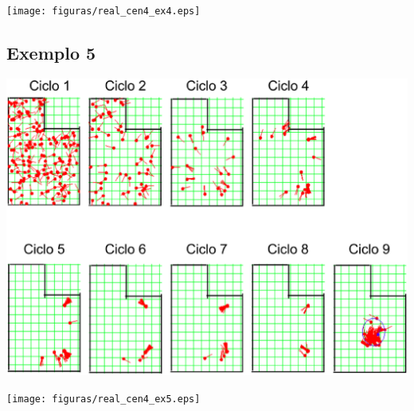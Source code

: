 {\centering
\texttt{[image: figuras/real\_cen4\_ex4.eps]}
\label{img:real_cen4_ex4}
\par}

\subsection{Exemplo 5}

{\centering
\includegraphics[scale=0.4]{figuras/cen4_ex5.eps}
\label{img:cen4_ex5}
\par}

{\centering
\texttt{[image: figuras/real\_cen4\_ex5.eps]}
\label{img:real_cen4_ex5}
\par}
